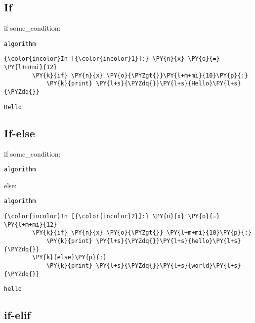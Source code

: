     \subsection{If}\label{if}

    if some\_condition:

\begin{verbatim}
algorithm
\end{verbatim}

    \begin{Verbatim}[commandchars=\\\{\}]
{\color{incolor}In [{\color{incolor}1}]:} \PY{n}{x} \PY{o}{=} \PY{l+m+mi}{12}
        \PY{k}{if} \PY{n}{x} \PY{o}{\PYZgt{}}\PY{l+m+mi}{10}\PY{p}{:}
            \PY{k}{print} \PY{l+s}{\PYZdq{}}\PY{l+s}{Hello}\PY{l+s}{\PYZdq{}}
\end{Verbatim}

    \begin{Verbatim}[commandchars=\\\{\}]
Hello
    \end{Verbatim}

    \subsection{If-else}\label{if-else}

    if some\_condition:

\begin{verbatim}
algorithm
\end{verbatim}

else:

\begin{verbatim}
algorithm
\end{verbatim}

    \begin{Verbatim}[commandchars=\\\{\}]
{\color{incolor}In [{\color{incolor}2}]:} \PY{n}{x} \PY{o}{=} \PY{l+m+mi}{12}
        \PY{k}{if} \PY{n}{x} \PY{o}{\PYZgt{}} \PY{l+m+mi}{10}\PY{p}{:}
            \PY{k}{print} \PY{l+s}{\PYZdq{}}\PY{l+s}{hello}\PY{l+s}{\PYZdq{}}
        \PY{k}{else}\PY{p}{:}
            \PY{k}{print} \PY{l+s}{\PYZdq{}}\PY{l+s}{world}\PY{l+s}{\PYZdq{}}
\end{Verbatim}

    \begin{Verbatim}[commandchars=\\\{\}]
hello
    \end{Verbatim}

    \subsection{if-elif}\label{if-elif}

